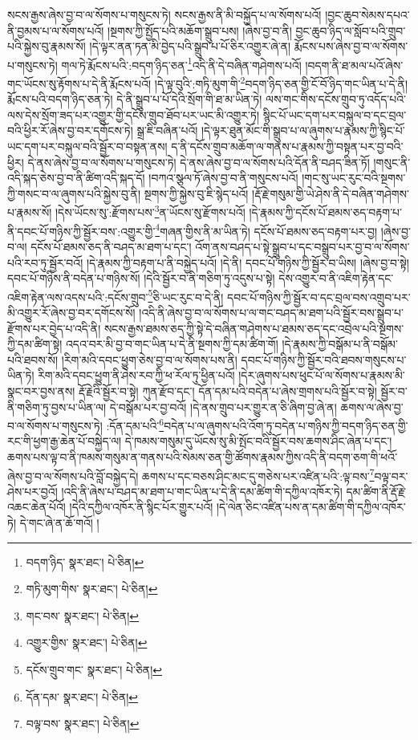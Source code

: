 སངས་རྒྱས་ཞེས་བྱ་བ་ལ་སོགས་པ་གསུངས་ཏེ། སངས་རྒྱས་ནི་མི་བསྐྱོད་པ་ལ་སོགས་པའོ། །བྱང་ཆུབ་སེམས་དཔའ་ནི་བྱམས་པ་ལ་སོགས་པའོ། །སྔགས་ཀྱི་སྤྱོད་པའི་མཆོག་སྒྲུབ་པས། །ཞེས་བྱ་བ་ནི། བྱང་ཆུབ་ཉིད་ལ་སློབ་པའི་གྲུབ་པའི་སྐྱེས་བུ་རྣམས་སོ། །དེ་ལྟར་ནན་ཏན་མི་བྱེད་པའི་སྒྲུབ་པ་པོ་ཅིར་འགྱུར་ཞེ་ན། རྨོངས་པས་ཞེས་བྱ་བ་ལ་སོགས་པ་གསུངས་ཏེ། གལ་ཏེ་རྨོངས་པའི་:བདག་ཉིད་ཅན་\footnote{བདག་ཉིད་  སྣར་ཐང་།  པེ་ཅིན། }འདི་ནི་དེ་བཞིན་གཤེགས་པའོ། །བདག་ནི་ཐ་མལ་པའོ་ཞེས་གང་ཡོངས་སུ་རྟོགས་པ་དེ་ནི་རྨོངས་པའོ། །དེ་ལྟ་བུའི་:གཏི་མུག་གི་\footnote{གཏི་མུག་གིས་  སྣར་ཐང་།  པེ་ཅིན། }བདག་ཉིད་ཅན་གྱི་ངོ་བོ་ཉིད་གང་ཡིན་པ་དེ་ནི། རྨོངས་པའི་བདག་ཉིད་ཅན་ཏེ། དེ་ནི་སྒྲུབ་པ་པོ་དེའི་སྲོག་གི་ཐ་མ་ཡིན་ཏེ། ལས་གང་གིས་དངོས་གྲུབ་ཏུ་འདོད་པའི་ལས་དེས་སྲོག་ཟད་པར་འགྱུར་གྱི་དངོས་གྲུབ་ཐོབ་པར་ཡང་མི་འགྱུར་ཏེ། སྙིང་པོ་ཡང་དག་པར་བསྐུལ་བ་དང་བྲལ་བའི་ཕྱིར་རོ་ཞེས་བྱ་བར་དགོངས་ཏེ། སྒྲ་ཇི་བཞིན་པའོ། །དེ་ལྟར་ཐུན་མོང་གི་སྒྲུབ་པ་ལ་ཞུགས་པ་རྣམས་ཀྱི་སྙིང་པོ་ཡང་དག་པར་བསྐུལ་བའི་སྦྱོར་བ་བསྟན་ནས། ད་ནི་དངོས་གྲུབ་མཆོག་ལ་གནས་པ་རྣམས་ཀྱི་བསྟན་པར་བྱ་བའི་ཕྱིར། དེ་ནས་ཞེས་བྱ་བ་ལ་སོགས་པ་གསུངས་ཏེ། དེ་ནས་ཞེས་བྱ་བ་ལ་སོགས་པའི་དོན་ནི་བཤད་ཟིན་ཏོ། །གསུང་ནི་འདི་སྐད་ཅེས་བྱ་བ་ནི་ཚིག་འདི་སྐད་དོ། །བཀའ་སྩལ་ཏོ་ཞེས་བྱ་བ་ནི་གསུངས་པའོ། །གང་སུ་ཡང་རུང་བའི་སྔགས་ཀྱི་གསང་བ་ལ་ཞུགས་པའི་སྐྱེས་བུ་ནི། སྔགས་ཀྱི་སྐྱེས་བུ་ཇི་སྙེད་པའོ། །རྡོ་རྗེ་གསུམ་གྱི་ཡེ་ཤེས་ནི་དེ་བཞིན་གཤེགས་པ་རྣམས་སོ། །དེས་ཡོངས་སུ་:རྫོགས་པས་\footnote{གང་བས་  སྣར་ཐང་།  པེ་ཅིན། }ན་ཡོངས་སུ་རྫོགས་པའོ། །དེ་རྣམས་ཀྱི་དངོས་པོ་ཐམས་ཅད་བརྟག་པ་ནི་དབང་པོ་གཉིས་ཀྱི་སྦྱོར་བས་:འགྱུར་གྱི་\footnote{འགྱུར་གྱིས་  སྣར་ཐང་།  པེ་ཅིན། }གཞན་གྱིས་ནི་མ་ཡིན་ཏེ། དངོས་པོ་ཐམས་ཅད་བརྟག་པར་བྱ། །ཞེས་བྱ་བ་ལ། དངོས་པོ་ཐམས་ཅད་ནི་བཤད་མ་ཐག་པ་དང་། འོག་ནས་བཤད་པ་སྟེ་སྒྲུབ་པ་དང་བསྒྲུབ་པར་བྱ་བ་ལ་སོགས་པའི་རབ་ཏུ་སྦྱོར་བའོ། །དེ་རྣམས་ཀྱི་བརྟག་པ་ནི་བསྐྱེད་པའོ། །དེ་ནི། དབང་པོ་གཉིས་ཀྱི་སྦྱོར་བ་ཡིས། །ཞེས་བྱ་བ་སྟེ། དབང་པོ་གཉིས་ནི་བདེན་པ་གཉིས་སོ། །དེའི་སྦྱོར་བ་ནི་གཅིག་ཏུ་འདུས་པ་སྟེ། དེས་འགྱུར་བ་ནི་འཇིག་རྟེན་དང་འཇིག་རྟེན་ལས་འདས་པའི་:དངོས་གྲུབ་\footnote{དངོས་གྲུབ་གང་  སྣར་ཐང་།  པེ་ཅིན། }ཅི་ཡང་རུང་བ་དེ་ནི། དབང་པོ་གཉིས་ཀྱི་སྦྱོར་བ་དང་བྲལ་བས་འགྲུབ་པར་མི་འགྱུར་རོ་ཞེས་བྱ་བར་དགོངས་སོ། །འདི་ནི་ཞེས་བྱ་བ་ལ་སོགས་པ་ལ་གང་བཤད་མ་ཐག་པའི་སྦྱོར་བས་སྒྲུབ་པ་རྫོགས་པར་བྱེད་པ་འདི་ནི། སངས་རྒྱས་ཐམས་ཅད་ཀྱི་སྟེ་དེ་བཞིན་གཤེགས་པ་ཐམས་ཅད་དང་འབྲེལ་པའི་སྔགས་ཀྱི་དམ་ཚིག་སྟེ། འདའ་བར་མི་བྱ་བ་གང་ཡིན་པ་དེ་ནི་སྔགས་ཀྱི་དམ་ཚིག་གོ། །དེ་རྣམས་ཀྱི་བསྒོམ་པ་ནི་བསྒོམ་པའི་ཐབས་སོ། །རིག་མའི་དབང་ཕྱུག་ཅེས་བྱ་བ་ལ་སོགས་པས་ནི། དབང་པོ་གཉིས་ཀྱི་སྦྱོར་བའི་ཐབས་གསུངས་པ་ཡིན་ཏེ། རིག་མའི་དབང་ཕྱུག་ནི་ཤེས་རབ་ཀྱི་ཕ་རོལ་ཏུ་ཕྱིན་པའོ། །དེར་ཞུགས་པས་ཕུང་པོ་ལ་སོགས་པ་རྣམས་མི་སྣང་བར་བྱས་ནས། རྡོ་རྗེའི་སྦྱོར་བ་སྟེ། ཀུན་རྫོབ་དང་། དོན་དམ་པའི་བདེན་པ་ཞེས་གྲགས་པའི་སྦྱོར་བ་སྟེ། སྦྱོར་བ་ནི་གཅིག་ཏུ་བྱས་པ་ཡིན་ལ། དེ་བསྒོམ་པར་བྱ་བའོ། །དེ་ནས་གྲུབ་པར་གྱུར་ན་ཅི་ཞིག་བྱ་ཞེ་ན། ཆགས་ལ་ཞེས་བྱ་བ་ལ་སོགས་པ་གསུངས་ཏེ། :དོན་དམ་པའི་\footnote{དོན་དམ་  སྣར་ཐང་།  པེ་ཅིན། }བདེན་པ་ལ་ཞུགས་པའི་འོག་ཏུ་བདེན་པ་གཉིས་ཀྱི་བདག་ཉིད་ཅན་གྱི་རང་གི་ཕྱག་རྒྱ་ཆེན་པོ་བསྐྱེད་ལ། དེ་ཁམས་གསུམ་དུ་ཡོངས་སུ་མི་སྤོང་བའི་སྦྱོར་བས་ཆགས་ཤིང་ཞེན་པ་དང་། ཆགས་པས་ལྟ་བ་ནི་ཁམས་གསུམ་ན་གནས་པའི་སེམས་ཅན་གྱི་ཚོགས་རྣམས་ཀྱིས་འདི་ནི་བདག་ཅག་གི་ཕའོ་ཞེས་བྱ་བ་ལ་སོགས་པའི་བློ་བསྐྱེད་དེ། ཆགས་པ་དང་བཅས་ཤིང་མང་དུ་གཅེས་པར་འཛིན་པའི་:ལྟ་བས་\footnote{བལྟ་བས་  སྣར་ཐང་།  པེ་ཅིན། }བལྟ་བར་ཤེས་པར་བྱའོ། །འདི་ནི་ཞེས་པ་བཤད་མ་ཐག་པ་གང་ཡིན་པ་དེ་ནི་དམ་ཚིག་གི་དཀྱིལ་འཁོར་ཏེ། དམ་ཚིག་ནི་རྡོ་རྗེ་འཆང་ཆེན་པོའོ། །དེའི་དཀྱིལ་འཁོར་ནི་སྙིང་པོར་གྱུར་པའོ། །དེ་ལེན་ཅིང་འཛིན་པས་ན་དམ་ཚིག་གི་དཀྱིལ་འཁོར་ཏེ། དེ་གང་ཞེ་ན་ཆོ་གའོ། །
